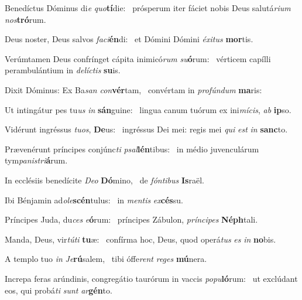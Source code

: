 
\item Benedíctus Dóminus di\textit{e} \textit{quo}\textbf{tí}die:~\psstar{} prósperum iter fáciet nobis Deus salutá\textit{rium} \textit{nos}\textbf{tró}rum.

\item Deus noster, Deus salvos \textit{faci}\textbf{én}di:~\psstar{} et Dómini Dómini \textit{éxitus} \textbf{mor}tis.

\item Verúmtamen Deus confrínget cápita inimicó\textit{rum} \textit{su}\textbf{ó}rum:~\psstar{} vérticem capílli perambulántium in \textit{delíctis} \textbf{su}is.

\item Dixit Dóminus: Ex Ba\textit{san} \textit{con}\textbf{vér}tam,~\psstar{} convértam in \textit{profúndum} \textbf{ma}ris:

\item Ut intingátur pes tu\textit{us} \textit{in} \textbf{sán}guine:~\psstar{} lingua canum tuórum ex ini\textit{mícis}, \textit{ab} \textbf{ip}so.

\item Vidérunt ingréssus \textit{tuos}, \textbf{De}us:~\psstar{} ingréssus Dei mei: regis mei \textit{qui} \textit{est} \textit{in} \textbf{sanc}to.

\item Prævenérunt príncipes conjúnc\textit{ti} \textit{psal}\textbf{lén}tibus:~\psstar{} in médio juvenculárum tym\textit{panistri}\textbf{á}rum.

\item In ecclésiis benedícite \textit{Deo} \textbf{Dó}mino,~\psstar{} de \textit{fóntibus} \textbf{Is}raël.

\item Ibi Bénjamin ad\textit{ole}\textbf{scén}tulus:~\psstar{} in \textit{mentis} \textit{ex}\textbf{cés}su.

\item Príncipes Juda, du\textit{ces} \textit{e}\textbf{ó}rum:~\psstar{} príncipes Zábulon, \textit{príncipes} \textbf{Néph}tali.

\item Manda, Deus, vir\textit{túti} \textbf{tu}æ:~\psstar{} confírma hoc, Deus, quod operá\textit{tus} \textit{es} \textit{in} \textbf{no}bis.

\item A templo tuo \textit{in} \textit{Je}\textbf{rú}salem,~\psstar{} tibi óffe\textit{rent} \textit{reges} \textbf{mú}nera.

\item Increpa feras arúndinis, congregátio taurórum in vaccis \textit{popu}\textbf{ló}rum:~\psstar{} ut exclúdant eos, qui probá\textit{ti} \textit{sunt} \textit{ar}\textbf{gén}to.

